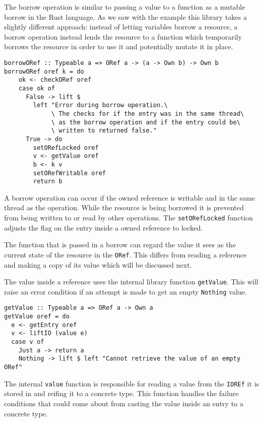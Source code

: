 \documentclass[onehalf,11pt]{beavtex}
\begin{document}
The borrow operation is similar to passing a value to a function as a mutable
borrow in the Rust language.
As we saw with the example this library takes a slightly different approach:
instead of letting variables borrow a resource, a borrow operation instead lends
the resource to a function which temporarily borrows the resource in order to
use it and potentially mutate it in place.

\begin{verbatim}
borrowORef :: Typeable a => ORef a -> (a -> Own b) -> Own b
borrowORef oref k = do
    ok <- checkORef oref
    case ok of
      False -> lift $
        left "Error during borrow operation.\
             \ The checks for if the entry was in the same thread\
             \ as the borrow operation and if the entry could be\
             \ written to returned false."
      True -> do
        setORefLocked oref
        v <- getValue oref
        b <- k v
        setORefWritable oref
        return b
\end{verbatim}

A borrow operation can occur if the owned reference is writable and
in the same thread as the operation.
While the resource is being borrowed it is prevented from being written to or
read by other operations. The \texttt{setORefLocked} function adjusts the flag
on the entry inside a owned reference to locked.

The function that is passed in a borrow can regard the value it sees as the
current state of the resource in the \texttt{ORef}. This differs from reading a
reference and making a copy of its value which will be discussed next.

The value inside a reference uses the internal library function
\texttt{getValue}. This will raise an error condition if an
attempt is made to get an empty \texttt{Nothing} value.

\begin{verbatim}
getValue :: Typeable a => ORef a -> Own a
getValue oref = do
  e <- getEntry oref
  v <- liftIO (value e)
  case v of
    Just a -> return a
    Nothing -> lift $ left "Cannot retrieve the value of an empty ORef"
\end{verbatim}

The internal \texttt{value} function is responsible for reading a value from
the \texttt{IOREf} it is stored in and reifing it to a concrete type.
This function handles the failure conditions that could come
about from casting the value inside an entry to a concrete type.
\end{document}
